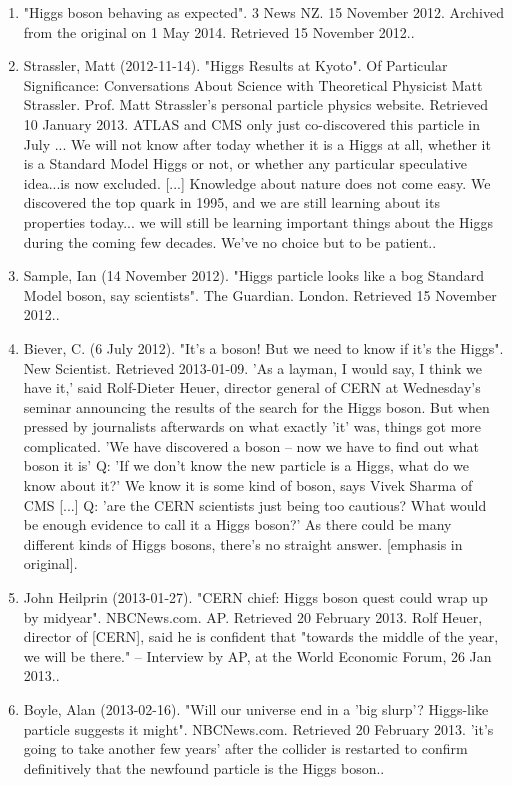\begin{enumerate}
    \item "Higgs boson behaving as expected". 3 News NZ. 15 November 2012. Archived from the original on 1 May 2014. Retrieved 15 November 2012..
    \item Strassler, Matt (2012-11-14). "Higgs Results at Kyoto". Of Particular Significance: Conversations About Science with Theoretical Physicist Matt Strassler. Prof. Matt Strassler's personal particle physics website. Retrieved 10 January 2013. ATLAS and CMS only just co-discovered this particle in July ... We will not know after today whether it is a Higgs at all, whether it is a Standard Model Higgs or not, or whether any particular speculative idea...is now excluded. [...] Knowledge about nature does not come easy. We discovered the top quark in 1995, and we are still learning about its properties today... we will still be learning important things about the Higgs during the coming few decades. We’ve no choice but to be patient..
    \item Sample, Ian (14 November 2012). "Higgs particle looks like a bog Standard Model boson, say scientists". The Guardian. London. Retrieved 15 November 2012..
    \item Biever, C. (6 July 2012). "It's a boson! But we need to know if it's the Higgs". New Scientist. Retrieved 2013-01-09. 'As a layman, I would say, I think we have it,' said Rolf-Dieter Heuer, director general of CERN at Wednesday's seminar announcing the results of the search for the Higgs boson. But when pressed by journalists afterwards on what exactly 'it' was, things got more complicated. 'We have discovered a boson – now we have to find out what boson it is' Q: 'If we don't know the new particle is a Higgs, what do we know about it?' We know it is some kind of boson, says Vivek Sharma of CMS [...] Q: 'are the CERN scientists just being too cautious? What would be enough evidence to call it a Higgs boson?' As there could be many different kinds of Higgs bosons, there's no straight answer. [emphasis in original].
    \item John Heilprin (2013-01-27). "CERN chief: Higgs boson quest could wrap up by midyear". NBCNews.com. AP. Retrieved 20 February 2013. Rolf Heuer, director of [CERN], said he is confident that "towards the middle of the year, we will be there." – Interview by AP, at the World Economic Forum, 26 Jan 2013..
    \item Boyle, Alan (2013-02-16). "Will our universe end in a 'big slurp'? Higgs-like particle suggests it might". NBCNews.com. Retrieved 20 February 2013. 'it's going to take another few years' after the collider is restarted to confirm definitively that the newfound particle is the Higgs boson..

\end{enumerate}
